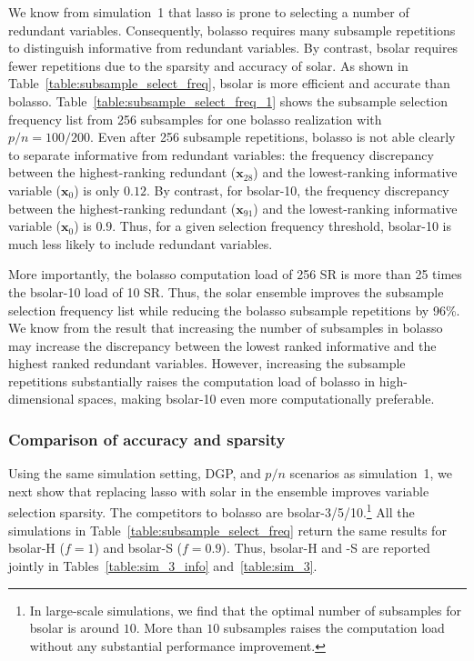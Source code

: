 \documentclass[12pt]{article}
\begin{document}
We know from simulation~1 that lasso is prone to selecting a number of redundant variables. Consequently, bolasso requires many subsample repetitions to distinguish informative from redundant variables. By contrast, bsolar requires fewer repetitions due to the sparsity and accuracy of solar. As shown in Table~\ref{table:subsample_select_freq}, bsolar is more efficient and accurate than bolasso. Table~\ref{table:subsample_select_freq_1} shows the subsample selection frequency list from 256 subsamples for one bolasso realization with $p/n=100/200$. Even after 256 subsample repetitions, bolasso is not able clearly to separate informative from redundant variables: the frequency discrepancy between the highest-ranking redundant ($\mathbf{x}_{28}$) and the lowest-ranking informative variable ($\mathbf{x}_0$) is only $0.12$. By contrast, for bsolar-10, the frequency discrepancy between the highest-ranking redundant ($\mathbf{x}_{91}$) and the lowest-ranking informative variable ($\mathbf{x}_0$) is $0.9$. Thus, for a given selection frequency threshold, bsolar-10 is much less likely to include redundant variables.

More importantly, the bolasso computation load of 256 SR is more than 25 times the bsolar-10 load of 10 SR. Thus, the solar ensemble improves the subsample selection frequency list while reducing the bolasso subsample repetitions by 96\%. We know from the \citet{bach2008bolasso} result that increasing the number of subsamples in bolasso may increase the discrepancy between the lowest ranked informative and the highest ranked redundant variables. However, increasing the subsample repetitions substantially raises the computation load of bolasso in high-dimensional spaces, making bsolar-10 even more computationally preferable.

\subsubsection*{Comparison of accuracy and sparsity}

Using the same simulation setting, DGP, and $p/n$ scenarios as simulation~1, we next show that replacing lasso with solar in the ensemble improves variable selection sparsity. The competitors to bolasso are bsolar-3/5/10.\footnote{In large-scale simulations, we find that the optimal number of subsamples for bsolar is around $10$. More than $10$ subsamples raises the computation load without any substantial performance improvement.} All the simulations in Table~\ref{table:subsample_select_freq} return the same results for bsolar-H ($f=1$) and bsolar-S ($f=0.9$). Thus, bsolar-H and -S are reported jointly in Tables~\ref{table:sim_3_info} and~\ref{table:sim_3}.
\end{document}
